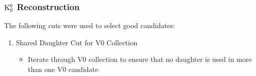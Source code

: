 \documentclass[/home/jesse/Analysis/FemtoAnalysis/AnalysisNotes/AnalysisNoteJBuxton.tex]{subfiles}
\begin{document}
\subsubsection{\texorpdfstring{$\rm K^{0}_{S}$}{TEXT} Reconstruction}
\label{K0sReconstruction}

The following cuts were used to select good \Ks candidates:

\begin{enumerate}
 \item Shared Daughter Cut for V0 Collection
 \begin{itemize}
  \item Iterate through V0 collection to ensure that no daughter is used in more than one V0 candidate
 \end{itemize} 
\end{enumerate}
\end{document}

